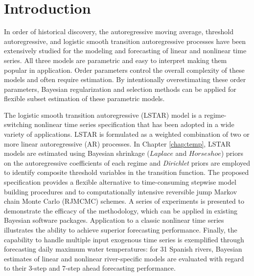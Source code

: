 \chapter{Introduction}
In order of historical discovery, the autoregressive moving average, threshold autoregressive, and logistic smooth transition autoregressive processes have been extensively studied for the modeling and forecasting of linear and nonlinear time series. All three models are parametric and easy to interpret making them popular in application. Order parameters control the overall complexity of these models and often require estimation. By intentionally overestimating these order parameters, Bayesian regularization and selection methods can be applied for flexible subset estimation of these parametric models. 

The logistic smooth transition autoregressive (LSTAR) model is a regime-switching nonlinear time series specification that has been adopted in a wide variety of applications. LSTAR is formulated as a weighted combination of two or more linear autoregressive (AR) processes. In Chapter \ref{chap:temp}, LSTAR models are estimated using Bayesian shrinkage ($Laplace$ and $Horseshoe$) priors on the autoregressive coefficients of each regime and \textit{Dirichlet} priors are employed to identify composite threshold variables in the transition function. The proposed specification provides a flexible alternative to time-consuming stepwise model building procedures and to computationally intensive reversible jump Markov chain Monte Carlo (RJMCMC) schemes. A series of experiments is presented to demonstrate the efficacy of the methodology, which can be applied in existing Bayesian software packages. Application to a classic nonlinear time series illustrates the ability to achieve superior forecasting performance. Finally, the capability to handle multiple input exogenous time series is exemplified through forecasting daily maximum water temperatures: for 31 Spanish rivers, Bayesian estimates of linear and nonlinear river-specific models are evaluated with regard to their 3-step and 7-step ahead forecasting performance.

